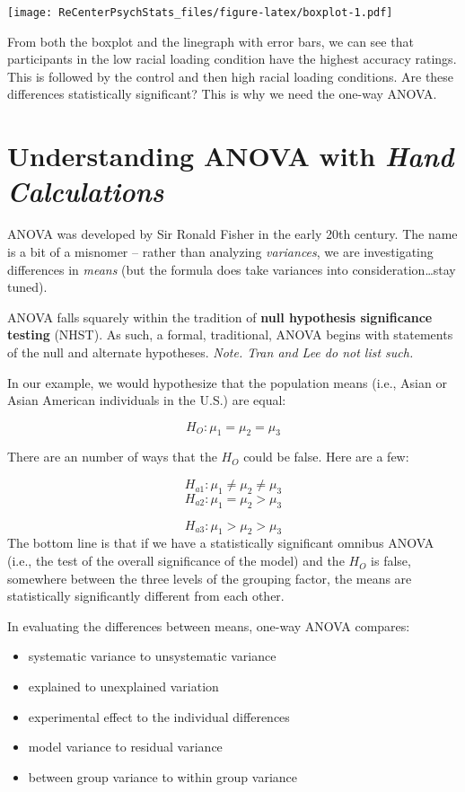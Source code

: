 \documentclass[
  english,
]{book}
\providecommand{\tightlist}{%
  \setlength{\itemsep}{0pt}\setlength{\parskip}{0pt}}
\begin{document}
\texttt{[image: ReCenterPsychStats\_files/figure-latex/boxplot-1.pdf]}

From both the boxplot and the linegraph with error bars, we can see that participants in the low racial loading condition have the highest accuracy ratings. This is followed by the control and then high racial loading conditions. Are these differences statistically significant? This is why we need the one-way ANOVA.

\hypertarget{understanding-anova-with-hand-calculations}{%
\section{\texorpdfstring{Understanding ANOVA with \emph{Hand Calculations}}{Understanding ANOVA with Hand Calculations}}\label{understanding-anova-with-hand-calculations}}

ANOVA was developed by Sir Ronald Fisher in the early 20th century. The name is a bit of a misnomer -- rather than analyzing \emph{variances}, we are investigating differences in \emph{means} (but the formula does take variances into consideration\ldots stay tuned).

ANOVA falls squarely within the tradition of \textbf{null hypothesis significance testing} (NHST). As such, a formal, traditional, ANOVA begins with statements of the null and alternate hypotheses. \emph{Note. Tran and Lee \citeyearpar{tran_you_2014} do not list such.}

In our example, we would hypothesize that the population means (i.e., Asian or Asian American individuals in the U.S.) are equal:

\[H_{O}:  \mu _{1} = \mu _{2} = \mu _{3}\]

There are an number of ways that the \(H_{O}\) could be false. Here are a few:

\[H_{a1}:  \mu _{1} \neq \mu _{2} \neq \mu _{3}\]
\[H_{a2}:  \mu _{1} =  \mu _{2} > \mu _{3}\]

\[H_{a3}:  \mu _{1} >  \mu _{2} > \mu _{3}\]
The bottom line is that if we have a statistically significant omnibus ANOVA (i.e., the test of the overall significance of the model) and the \(H_{O}\) is false, somewhere between the three levels of the grouping factor, the means are statistically significantly different from each other.

In evaluating the differences between means, one-way ANOVA compares:

\begin{itemize}
\tightlist
\item
  systematic variance to unsystematic variance
\item
  explained to unexplained variation
\item
  experimental effect to the individual differences
\item
  model variance to residual variance
\item
  between group variance to within group variance
\end{itemize}
\end{document}
